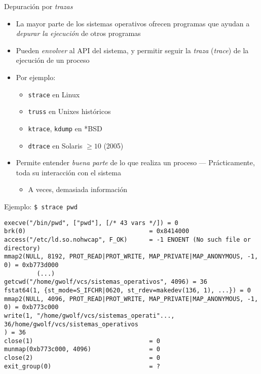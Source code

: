 \documentclass[presentation]{beamer}
\begin{document}
\begin{frame}[label={sec:org9bb839f},fragile]{Depuración por \emph{trazas}}
 \begin{itemize}
\item La mayor parte de los sistemas operativos ofrecen programas que
ayudan a \emph{depurar la ejecución} de otros programas
\item Pueden \emph{envolver} al API del sistema, y permitir seguir la \emph{traza}
(\emph{trace}) de la ejecución de un proceso
\item Por ejemplo:
\begin{itemize}
\item \texttt{strace} en Linux
\item \texttt{truss} en Unixes históricos
\item \texttt{ktrace}, \texttt{kdump} en *BSD
\item \texttt{dtrace} en Solaris \(\ge 10\) (2005)
\end{itemize}
\item Permite entender \emph{buena parte} de lo que realiza un proceso —
Prácticamente, toda su interacción con el sistema
\begin{itemize}
\item A veces, demasiada información
\end{itemize}
\end{itemize}
\end{frame}

\begin{frame}[label={sec:org63a7284},fragile]{Ejemplo: \texttt{\$ strace pwd}}
 \begin{verbatim}
execve("/bin/pwd", ["pwd"], [/* 43 vars */]) = 0
brk(0)                                  = 0x8414000
access("/etc/ld.so.nohwcap", F_OK)      = -1 ENOENT (No such file or directory)
mmap2(NULL, 8192, PROT_READ|PROT_WRITE, MAP_PRIVATE|MAP_ANONYMOUS, -1, 0) = 0xb773d000
	     (...)
getcwd("/home/gwolf/vcs/sistemas_operativos", 4096) = 36
fstat64(1, {st_mode=S_IFCHR|0620, st_rdev=makedev(136, 1), ...}) = 0
mmap2(NULL, 4096, PROT_READ|PROT_WRITE, MAP_PRIVATE|MAP_ANONYMOUS, -1, 0) = 0xb773c000
write(1, "/home/gwolf/vcs/sistemas_operati"..., 36/home/gwolf/vcs/sistemas_operativos
) = 36
close(1)                                = 0
munmap(0xb773c000, 4096)                = 0
close(2)                                = 0
exit_group(0)                           = ?
\end{verbatim}
\end{frame}
\end{document}
